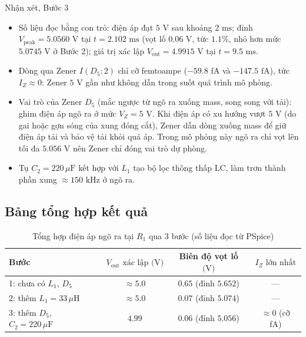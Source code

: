 \begin{notebox}{Nhận xét, Bước 3}
  \begin{itemize}[leftmargin=1.5em,itemsep=2pt,topsep=2pt]
    \item Số liệu đọc bằng con trỏ: điện áp đạt $5\text{ V}$ sau khoảng $2\text{ ms}$; đỉnh $V_{\text{peak}} = 5.0560\text{ V}$ tại $t = 2.102\text{ ms}$ (vọt lố $0.06\text{ V}$, tức $1.1\%$, nhỏ hơn mức $5.0745\text{ V}$ ở Bước 2); giá trị xác lập $V_{\text{out}} = 4.9915\text{ V}$ tại $t = 9.5\text{ ms}$.
    \item Dòng qua Zener $I(D_5{:}2)$ chỉ cỡ femtoampe ($-59.8\text{ fA}$ và $-147.5\text{ fA}$), tức $I_Z \approx 0$: Zener $5\text{ V}$ gần như không dẫn trong suốt quá trình mô phỏng.
    \item Vai trò của Zener $D_5$ (mắc ngược từ ngõ ra xuống mass, song song với tải): ghim điện áp ngõ ra ở mức $V_Z = 5\text{ V}$. Khi điện áp có xu hướng vượt $5\text{ V}$ (do gai hoặc gợn sóng của xung đóng cắt), Zener dẫn dòng xuống mass để giữ điện áp tải và bảo vệ tải khỏi quá áp. Trong mô phỏng này ngõ ra chỉ vọt lên tối đa $5.056\text{ V}$ nên Zener chỉ đóng vai trò dự phòng.
    \item Tụ $C_2 = 220\,\mu\text{F}$ kết hợp với $L_1$ tạo bộ lọc thông thấp LC, làm trơn thành phần xung $\approx 150\text{ kHz}$ ở ngõ ra.
  \end{itemize}
\end{notebox}

\subsection{Bảng tổng hợp kết quả}
\begin{table}[H]
  \centering
  \caption{Tổng hợp điện áp ngõ ra tại $R_1$ qua 3 bước (số liệu đọc từ PSpice)}
  \begin{tabular}{lccc}
    \toprule
    \textbf{Bước} & $V_{\text{out}}\text{ xác lập (V)}$ & Biên độ vọt lố $\text{(V)}$ & $I_Z\text{ lớn nhất}$ \\
    \midrule
    1: chưa có $L_1$, $D_5$                  & $\approx 5.0$ & $0.65$ (đỉnh $5.652$) & --- \\
    2: thêm $L_1 = 33\,\mu\text{H}$          & $\approx 5.0$ & $0.07$ (đỉnh $5.074$) & --- \\
    3: thêm $D_5$, $C_2 = 220\,\mu\text{F}$  & $4.99$        & $0.06$ (đỉnh $5.056$) & $\approx 0$ (cỡ fA) \\
    \bottomrule
  \end{tabular}
\end{table}
